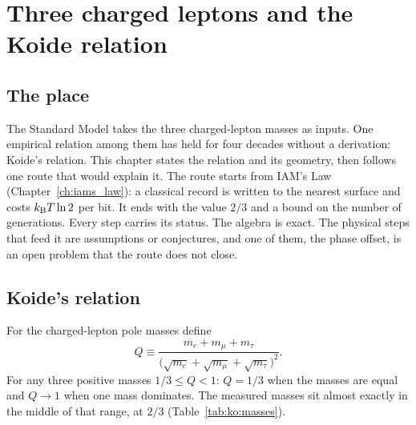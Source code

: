 \chapter{Three charged leptons and the Koide relation}\label{ch:koide}

\section*{The place}
The Standard Model takes the three charged-lepton masses as inputs. One empirical relation among them has held for four decades without a
derivation: Koide's relation. This chapter states the relation and its geometry, then follows one route that would explain it. The route
starts from IAM's Law (Chapter~\ref{ch:iams_law}): a classical record is written to the nearest surface and costs $k_{\mathrm B} T\ln2$ per bit. It
ends with the value $2/3$ and a bound on the number of generations. Every step carries its status. The algebra is exact. The physical steps
that feed it are assumptions or conjectures, and one of them, the phase offset, is an open problem that the route does not close.

\section{Koide's relation}\label{sec:ko:relation}
For the charged-lepton pole masses define~\cite{Koide1982,Koide1983,Koide1983b}
\begin{equation}
Q\equiv\frac{m_e+m_\mu+m_\tau}{\big(\sqrt{m_e}+\sqrt{m_\mu}+\sqrt{m_\tau}\big)^2}.\label{eq:ko:Q}
\end{equation}
For any three positive masses $1/3\le Q<1$: $Q=1/3$ when the masses are equal and $Q\to1$ when one mass dominates. \derived{} The measured
masses sit almost exactly in the middle of that range, at $2/3$ (Table~\ref{tab:ko:masses}).

